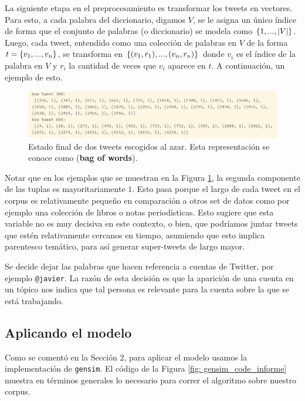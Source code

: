 \documentclass{article}
\begin{document}
	

	La siguiente etapa en el preprocesamiento es transformar los tweets en vectores. Para esto, a cada palabra del diccionario, digamos $V$, se le asigna un único índice de forma que el conjunto de palabras (o diccionario) se modela como $\left\{1,...,|V|\right\}$. Luego, cada tweet, entendido como una colección de palabras en $V$ de la forma $t=\left\{v_1,...,v_n\right\}$, se transforma en $\left\{(v_1,r_1),...,(v_n,r_n)\right\}$ donde $v_i$ es el índice de la palabra en $V$ y $r_i$ la cantidad de veces que $v_i$ aparece en $t$. A continuación, un ejemplo de esto.
	
	\begin{figure}[H]
		\centering
		\includegraphics[scale=.5]{../imgs/bow_tweet_informe.png}
		\caption{Estado final de dos tweets escogidos al azar. Esta representación se conoce como  (\textbf{bag of words}).}
		\label{fig: bow_example}
	\end{figure}
	
	\begin{remark}
		Notar que en los ejemplos que se muestran en la Figura \ref{fig: bow_example}, la segunda componente de las tuplas es mayoritariamente $1$. Esto pasa porque el largo de cada tweet en el corpus es relativamente pequeño en comparación a otros set de datos como por ejemplo una colección de libros o notas periodísticas. Esto sugiere que esta variable no es muy decisiva en este contexto, o bien, que podríamos juntar tweets que estén relativamente cercanos en tiempo, asumiendo que esto implica parentesco temático, para así generar super-tweets de largo mayor. 
	\end{remark}

	\begin{remark}
		Se decide dejar las palabras que hacen referencia a cuentas de Twitter, por ejemplo \texttt{@javier}. La razón de esta decisión es que la aparición de una cuenta en un tópico nos indica que tal persona es relevante para la cuenta sobre la que se está trabajando.
	\end{remark}

	\subsection{Aplicando el modelo}
	Como se comentó en la Sección $2$, para aplicar el modelo usamos la implementación de \texttt{gensim}. El código de la Figura \ref{fig: gensim_code_informe} muestra en términos generales lo necesario para correr el algoritmo sobre nuestro corpus.
	
\end{document}
